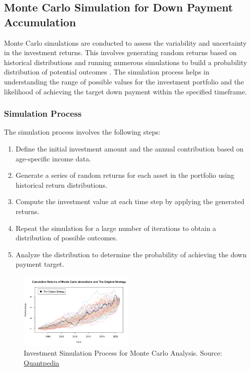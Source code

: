 \subsection{Monte Carlo Simulation for Down Payment Accumulation}
Monte Carlo simulations are conducted to assess the variability and uncertainty in the investment returns. This involves generating random returns based on historical distributions and running numerous simulations to build a probability distribution of potential outcomes \citep{boyle1977options}. The simulation process helps in understanding the range of possible values for the investment portfolio and the likelihood of achieving the target down payment within the specified timeframe.

\subsubsection{Simulation Process}
The simulation process involves the following steps:
\begin{enumerate}
    \item Define the initial investment amount and the annual contribution based on age-specific income data.
    \item Generate a series of random returns for each asset in the portfolio using historical return distributions.
    \item Compute the investment value at each time step by applying the generated returns.
    \item Repeat the simulation for a large number of iterations to obtain a distribution of possible outcomes.
    \item Analyze the distribution to determine the probability of achieving the down payment target.
\end{enumerate}

\begin{figure}[h]
\centering
\includegraphics[width=0.5\textwidth]{investment_simulation_process.png}
\caption{Investment Simulation Process for Monte Carlo Analysis. Source: \href{https://quantpedia.com/introduction-and-examples-of-monte-carlo-strategy-simulation/}{Quantpedia}}
\label{fig:simulation_process}
\end{figure}

